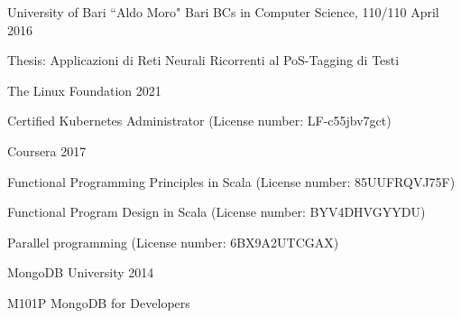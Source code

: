 \documentclass{resume} %
\begin{document}


\cvEntry
  {University of Bari ``Aldo Moro"}
  {Bari}
  {BCs in Computer Science, 110/110}
  {April 2016}{
    \begin{cvEntryItems}
      Thesis: Applicazioni di Reti Neurali Ricorrenti al PoS-Tagging di Testi
    \end{cvEntryItems}
  }





\cvEntry
  {The Linux Foundation}
  {2021}{}{}{
    \begin{cvEntryItems}
      \item Certified Kubernetes Administrator (License number: LF-c55jbv7gct)
    \end{cvEntryItems}
  }


\cvEntry
  {Coursera}
  {2017}{}{}{
    \begin{cvEntryItems}
      \item Functional Programming Principles in Scala (License number: 85UUFRQVJ75F)
      \item Functional Program Design in Scala (License number: BYV4DHVGYYDU)
      \item Parallel programming (License number: 6BX9A2UTCGAX)
    \end{cvEntryItems}
  }


\cvEntry
  {MongoDB University}
  {2014}{}{}{
    \begin{cvEntryItems}
      \item M101P MongoDB for Developers
    \end{cvEntryItems}
  }

\end{document}
